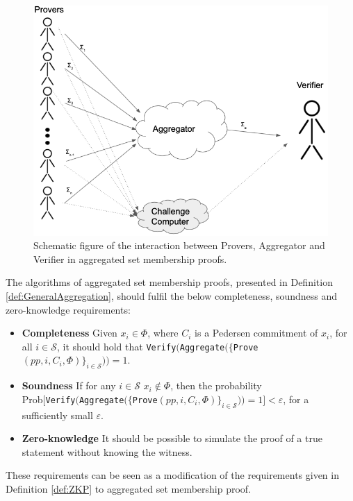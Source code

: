  \begin{figure}
\includegraphics[width=\linewidth]{./figure/oneagg.png}
\caption{Schematic figure of the interaction between Provers, Aggregator and Verifier in aggregated set membership proofs. }
\label{fig:gen_workflow}
\end{figure} 




The algorithms of aggregated set membership proofs, presented in Definition \ref{def:GeneralAggregation}, should fulfil the below completeness, soundness and zero-knowledge requirements:
\begin{itemize}
\item \textbf{Completeness} Given $x_i\in\Phi$, where $C_i$ is a Pedersen commitment of $x_i$, for all $i\in\mathcal{S}$, it should hold that
 \texttt{Verify}$($\texttt{Aggregate}$(\{$\texttt{Prove}$(pp,i,C_i,\Phi)\}_{i\in\mathcal{S}}) )= 1$. 
\item \textbf{Soundness} If for any $i\in\mathcal{S}$ $x_i\notin\Phi$, then the probability  \\ Prob$[ $\texttt{Verify}$($\texttt{Aggregate}$(\{$\texttt{Prove}$(pp,i,C_i,\Phi)\}_{i\in\mathcal{S}}) ) = 1] < \varepsilon$, for a sufficiently small $\varepsilon$. 
\item  \textbf{Zero-knowledge} It should be possible to simulate the proof of a true statement without knowing the witness.
\end{itemize}

These requirements can be seen as a modification of the requirements given in Definition \ref{def:ZKP} to aggregated set membership proof. 



